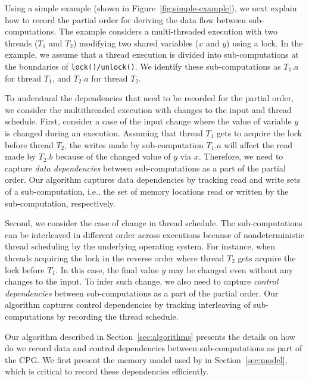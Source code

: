 Using a simple example (shown in Figure~\ref{fig:simple-example}), we next explain how to record  the partial order for deriving the data flow between sub-computations. The example considers a multi-threaded execution with two threads ($T_1$ and $T_2$) modifying two shared variables ($x$ and $y$) using a lock. In the example, we assume that a thread execution is divided into sub-computations at the boundaries of {\tt lock()/unlock()}. We identify these sub-computations as $T_1.a$ for thread $T_1$, and $T_2.a$ for thread $T_2$.



To understand the dependencies that need to be recorded for the partial order, we consider the multithreaded execution with changes to the input and thread schedule.  First, consider a case of the input change where the value of variable $y$ is changed during an execution. Assuming that thread $T_1$ gets to acquire the lock before thread $T_2$, the writes made by sub-computation $T_1.a$ will affect the read made by $T_2.b$ because of the changed value of $y$ via  $x$. Therefore, we need to capture {\em data dependencies} between sub-computations as a part of the partial order. Our algorithm captures data dependencies by tracking read and write sets of a sub-computation, i.e., the set of memory locations read or written by the sub-computation, respectively.

Second, we consider the case of change in thread schedule. The sub-computations can be interleaved in different order across executions because of nondeterministic thread scheduling by the underlying operating system. For instance, when threads acquiring the lock in the reverse order where thread $T_2$ gets acquire the lock before $T_1$. In this case, the final value $y$ may be changed even without any changes to the input. To infer such change, we also need to capture {\em control dependencies}   between sub-computations as a part of the partial order. Our algorithm captures control dependencies by tracking interleaving of sub-computations by recording the thread schedule.





Our algorithm described in Section~\ref{sec:algorithms} presents the details on how do we record data and control dependencies between sub-computations as part of the CPG. We first present the memory model used by \projecttitle in Section~\ref{sec:model}, which is critical to record these dependencies efficiently.














